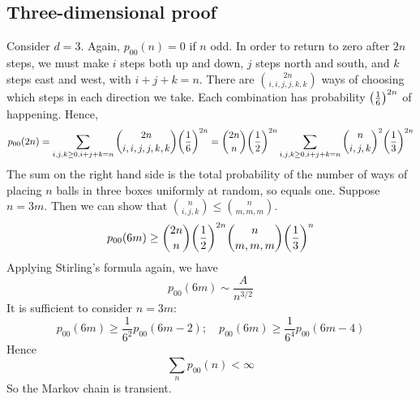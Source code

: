 \subsection{Three-dimensional proof}
Consider \( d = 3 \).
Again, \( p_{00}(n) = 0 \) if \( n \) odd.
In order to return to zero after \( 2n \) steps, we must make \( i \) steps both up and down, \( j \) steps north and south, and \( k \) steps east and west, with \( i+j+k=n \).
There are \( \binom{2n}{i,i,j,j,k,k} \) ways of choosing which steps in each direction we take.
Each combination has probability \( \qty(\frac{1}{6})^{2n} \) of happening.
Hence,
\[
	p_{00}(2n) = \sum_{i,j,k \geq 0, i+j+k=n} \binom{2n}{i,i,j,j,k,k} \qty(\frac{1}{6})^{2n} = \binom{2n}{n} \qty(\frac{1}{2})^{2n} \sum_{i,j,k \geq 0, i+j+k=n} \binom{n}{i,j,k}^2 \qty(\frac{1}{3})^{2n}
\]
The sum on the right hand side is the total probability of the number of ways of placing \( n \) balls in three boxes uniformly at random, so equals one.
Suppose \( n = 3m \).
Then we can show that \( \binom{n}{i,j,k} \leq \binom{n}{m,m,m} \).
\[
	p_{00}(6m) \geq \binom{2n}{n} \qty(\frac{1}{2})^{2n} \binom{n}{m,m,m} \qty(\frac{1}{3})^{n}
\]
Applying Stirling's formula again, we have
\[
	p_{00}(6m) \sim \frac{A}{n^{3/2}}
\]
It is sufficient to consider \( n = 3m \):
\[
	p_{00}(6m) \geq \frac{1}{6^2} p_{00}(6m-2);\quad p_{00}(6m) \geq \frac{1}{6^4} p_{00}(6m-4)
\]
Hence
\[
	\sum_n p_{00}(n) < \infty
\]
So the Markov chain is transient.
